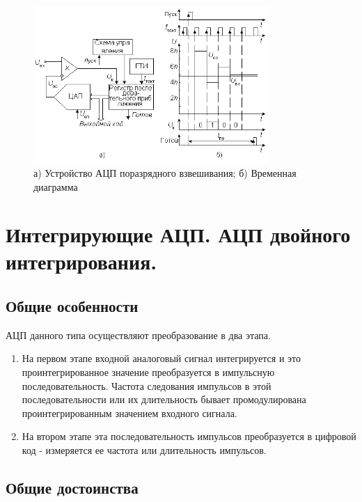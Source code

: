 \documentclass[unicode, 12pt, a4paper, oneside]{article}
\begin{document}
\begin{figure}[H]
\centering
\includegraphics[width=0.8\textwidth]{16_ADC_serial_approx.png}
\caption{а) Устройство АЦП поразрядного взвешивания; б) Временная диаграмма}
\label{fig:16_ADC_serial_approx}
\end{figure}


\section{Интегрирующие АЦП. АЦП двойного интегрирования.}

\subsection*{Общие особенности}

АЦП данного типа осуществляют преобразование в два этапа.

\begin{enumerate}
\item На первом этапе входной аналоговый сигнал интегрируется и это проинтегрированное значение преобразуется в импульсную последовательность. Частота следования импульсов в этой последовательности или их длительность бывает промодулирована проинтегрированным значением входного сигнала.
\item На втором этапе эта последовательность импульсов преобразуется в цифровой код - измеряется ее частота или длительность импульсов.
\end{enumerate}

\subsection*{Общие достоинства}
\end{document}
